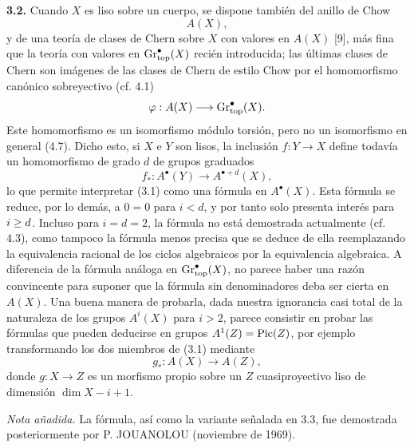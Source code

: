 \textbf{3.2.} Cuando $X$ es liso sobre un cuerpo, se dispone también del
anillo de Chow
\[
A(X),
\]
y de una teoría de clases de Chern sobre $X$ con valores en $A(X)$ [9], más
fina que la teoría con valores en $\Gtop^\bullet(X)$ recién introducida; las
últimas clases de Chern son imágenes de las clases de Chern de estilo Chow
por el homomorfismo canónico sobreyectivo (cf. 4.1)
\[
\varphi:A(X)\longrightarrow\Gtop^\bullet(X).
\]
Este homomorfismo es un isomorfismo módulo torsión, pero no un isomorfismo en
general (4.7). Dicho esto, si $X$ e $Y$ son lisos, la inclusión $f:Y\to X$
define todavía un homomorfismo de grado $d$ de grupos graduados
\[
f_*:A^\bullet(Y)\longrightarrow A^{\bullet+d}(X),
\]
lo que permite interpretar (3.1) como una fórmula en $A^\bullet(X)$. Esta
fórmula se reduce, por lo demás, a $0=0$ para $i<d$, y por tanto solo
presenta interés para $i\sisi{>}{\ge}d$. Incluso para $i=d=2$, la fórmula no está %
demostrada actualmente (cf. 4.3), como tampoco la fórmula menos precisa que
se deduce de ella reemplazando la equivalencia racional de los ciclos
algebraicos por la equivalencia algebraica. A diferencia de la fórmula
análoga en $\Gtop^\bullet(X)$, no parece haber una razón convincente para
suponer que la fórmula sin denominadores deba ser cierta en $A(X)$. Una
buena manera de probarla, dada nuestra ignorancia casi total de la naturaleza
de los grupos $A^i(X)$ para $i>2$, parece consistir en probar las fórmulas
que pueden deducirse en grupos $A^1(Z)=\Pic(Z)$, por ejemplo transformando
los dos miembros de (3.1) mediante
\[
g_*:A(X)\longrightarrow A(Z),
\]
donde $g:X\to Z$ es un morfismo propio sobre un $Z$ cuasiproyectivo liso de
dimensión $\dim X-i+1$.

\emph{Nota añadida.} La fórmula, así como la variante señalada en 3.3, fue
demostrada posteriormente por P. JOUANOLOU (noviembre de 1969).

